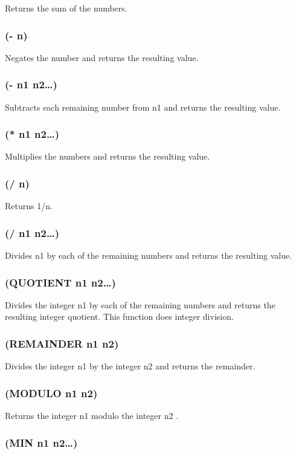 \documentclass[11pt]{article}
\begin{document}
Returns the sum of the numbers.
\subsubsection{(- n)}
\label{sec-4-25-21}

Negates the number and returns the resulting value.
\subsubsection{(- n1 n2\ldots{})}
\label{sec-4-25-22}

Subtracts each remaining number from n1 and returns the resulting
value.
\subsubsection{(* n1 n2\ldots{})}
\label{sec-4-25-23}

Multiplies the numbers and returns the resulting value.
\subsubsection{(/ n)}
\label{sec-4-25-24}

Returns 1/n.
\subsubsection{(/ n1 n2\ldots{})}
\label{sec-4-25-25}

Divides n1 by each of the remaining numbers and returns the resulting
value.
\subsubsection{(QUOTIENT n1 n2\ldots{})}
\label{sec-4-25-26}

Divides the integer n1 by each of the remaining numbers and returns
the resulting integer quotient.  This function does integer division.
\subsubsection{(REMAINDER n1 n2)}
\label{sec-4-25-27}

Divides the integer n1 by the integer n2 and returns the remainder.
\subsubsection{(MODULO n1 n2)}
\label{sec-4-25-28}

Returns the integer n1 modulo the integer n2 .
\subsubsection{(MIN n1 n2\ldots{})}
\label{sec-4-25-29}
\end{document}
